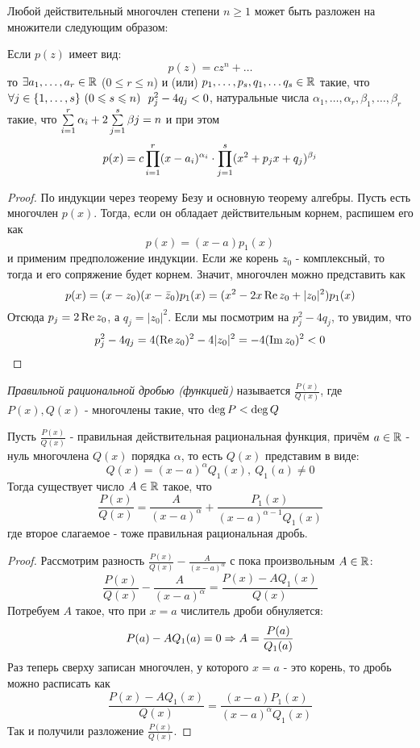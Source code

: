 \begin{corollary}
	Любой действительный многочлен степени $n \ge 1$ может быть разложен на множители следующим образом:
	
	Если $p(z)$ имеет вид:
	\[
		p(z) = cz^n + \ldots
	\]
	то $\exists a_1, \ldots, a_r \in \mathbb{R}$ ($0 \le r \le n$) и (или) $p_1, \ldots, p_s, q_1, \ldots q_s \in \mathbb{R}$ такие, что $\forall j \in \{1, \ldots, s\}\ (0 \leqslant s \leqslant n)\ \ p^2_j - 4q_j < 0$, натуральные числа $\alpha_1, \ldots, \alpha_r, \beta_1, \ldots, \beta_r$ такие, что $\sum\limits_{i = 1}^r \alpha_i + 2\sum\limits_{j = 1}^s \beta j = n$ и при этом
	\[
		p(x) = c \prod\limits_{i = 1}^r (x - a_i)^{\alpha_i} \cdot \prod\limits_{j = 1}^s (x^2 + p_j x + q_j)^{\beta_j}
	\]
\end{corollary}

\begin{proof}
	По индукции через теорему Безу и основную теорему алгебры. Пусть есть многочлен $p(x)$. Тогда, если он обладает действительным корнем, распишем его как
	\[
		p(x) = (x - a)p_1(x)
	\]
	и применим предположение индукции. Если же корень $z_0$ - комплексный, то тогда и его сопряжение будет корнем. Значит, многочлен можно представить как
	\[
		p(x) = (x - z_0)(x - \bar{z}_0)p_1(x) = (x^2 - 2x\operatorname{Re} z_0 + |z_0|^2)p_1(x)
	\]
	Отсюда $p_j = 2\operatorname{Re} z_0$, а $q_j = |z_0|^2$. Если мы посмотрим на $p^2_j - 4q_j$, то увидим, что
	\[
		p^2_j - 4q_j = 4(\operatorname{Re} z_0)^2 - 4|z_0|^2 = -4(\operatorname{Im} z_0)^2 < 0
	\]
\end{proof}

\begin{definition}
	\textit{Правильной рациональной дробью (функцией)} называется $\frac{P(x)}{Q(x)}$, где $P(x), Q(x)$ - многочлены такие, что $\operatorname{deg} P < \operatorname{deg} Q$
\end{definition}

\begin{lemma}
	Пусть $\frac{P(x)}{Q(x)}$ - правильная действительная рациональная функция, причём $a \in \mathbb{R}$ - нуль многочлена $Q(x)$ порядка $\alpha$, то есть $Q(x)$ представим в виде:
	\[
		Q(x) = (x - a)^\alpha Q_1(x),\ Q_1(a) \neq 0
	\]
	Тогда существует число $A \in \mathbb{R}$ такое, что
	\[
		\frac{P(x)}{Q(x)} = \frac{A}{(x - a)^\alpha} + \frac{P_1(x)}{(x - a)^{\alpha - 1} Q_1(x)}
	\]
	где второе слагаемое - тоже правильная рациональная дробь.
\end{lemma}

\begin{proof}
	Рассмотрим разность \(\frac{P(x)}{Q(x)} - \frac{A}{(x - a)^\alpha}\) с пока произвольным $A \in \mathbb{R}$:
	\[
		\frac{P(x)}{Q(x)} - \frac{A}{(x - a)^\alpha} = \frac{P(x) - AQ_1(x)}{Q(x)}
	\]
	Потребуем $A$ такое, что при $x = a$ числитель дроби обнуляется:
	\[
		P(a) - AQ_1(a) = 0 \Rightarrow A = \frac{P(a)}{Q_1(a)}
	\]
	Раз теперь сверху записан многочлен, у которого $x = a$ - это корень, то дробь можно расписать как
	\[
		\frac{P(x) - AQ_1(x)}{Q(x)} = \frac{(x - a)P_1(x)}{(x - a)^\alpha Q_1(x)}
	\]
	Так и получили разложение $\frac{P(x)}{Q(x)}$.
\end{proof}

